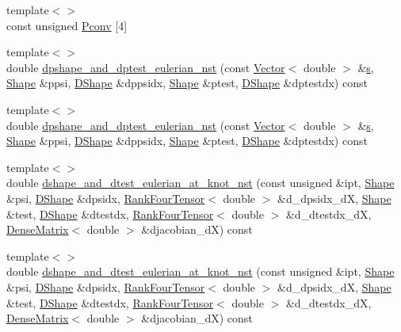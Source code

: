 \begin{DoxyCompactItemize}
{\footnotesize template$<$$>$ }\\const unsigned \hyperlink{classoomph_1_1TTaylorHoodElement_a294e334fc6a5632417b23ebf37fc7b16}{Pconv} \mbox{[}4\mbox{]}
\item 
{\footnotesize template$<$$>$ }\\double \hyperlink{classoomph_1_1TTaylorHoodElement_a24aab07a32be810c3d020072a3f4d84b}{dpshape\+\_\+and\+\_\+dptest\+\_\+eulerian\+\_\+nst} (const \hyperlink{classoomph_1_1Vector}{Vector}$<$ double $>$ \&\hyperlink{cfortran_8h_ab7123126e4885ef647dd9c6e3807a21c}{s}, \hyperlink{classoomph_1_1Shape}{Shape} \&ppsi, \hyperlink{classoomph_1_1DShape}{D\+Shape} \&dppsidx, \hyperlink{classoomph_1_1Shape}{Shape} \&ptest, \hyperlink{classoomph_1_1DShape}{D\+Shape} \&dptestdx) const
\item 
{\footnotesize template$<$$>$ }\\double \hyperlink{classoomph_1_1TTaylorHoodElement_a1d9b249727edb35ae6f454a0eb3f779c}{dpshape\+\_\+and\+\_\+dptest\+\_\+eulerian\+\_\+nst} (const \hyperlink{classoomph_1_1Vector}{Vector}$<$ double $>$ \&\hyperlink{cfortran_8h_ab7123126e4885ef647dd9c6e3807a21c}{s}, \hyperlink{classoomph_1_1Shape}{Shape} \&ppsi, \hyperlink{classoomph_1_1DShape}{D\+Shape} \&dppsidx, \hyperlink{classoomph_1_1Shape}{Shape} \&ptest, \hyperlink{classoomph_1_1DShape}{D\+Shape} \&dptestdx) const
\item 
{\footnotesize template$<$$>$ }\\double \hyperlink{classoomph_1_1TTaylorHoodElement_aa7eedbdb84e6b53605be1ee04dcbb076}{dshape\+\_\+and\+\_\+dtest\+\_\+eulerian\+\_\+at\+\_\+knot\+\_\+nst} (const unsigned \&ipt, \hyperlink{classoomph_1_1Shape}{Shape} \&psi, \hyperlink{classoomph_1_1DShape}{D\+Shape} \&dpsidx, \hyperlink{classoomph_1_1RankFourTensor}{Rank\+Four\+Tensor}$<$ double $>$ \&d\+\_\+dpsidx\+\_\+dX, \hyperlink{classoomph_1_1Shape}{Shape} \&test, \hyperlink{classoomph_1_1DShape}{D\+Shape} \&dtestdx, \hyperlink{classoomph_1_1RankFourTensor}{Rank\+Four\+Tensor}$<$ double $>$ \&d\+\_\+dtestdx\+\_\+dX, \hyperlink{classoomph_1_1DenseMatrix}{Dense\+Matrix}$<$ double $>$ \&djacobian\+\_\+dX) const
\item 
{\footnotesize template$<$$>$ }\\double \hyperlink{classoomph_1_1TTaylorHoodElement_af289723f650d3a19a59a8337b6667c45}{dshape\+\_\+and\+\_\+dtest\+\_\+eulerian\+\_\+at\+\_\+knot\+\_\+nst} (const unsigned \&ipt, \hyperlink{classoomph_1_1Shape}{Shape} \&psi, \hyperlink{classoomph_1_1DShape}{D\+Shape} \&dpsidx, \hyperlink{classoomph_1_1RankFourTensor}{Rank\+Four\+Tensor}$<$ double $>$ \&d\+\_\+dpsidx\+\_\+dX, \hyperlink{classoomph_1_1Shape}{Shape} \&test, \hyperlink{classoomph_1_1DShape}{D\+Shape} \&dtestdx, \hyperlink{classoomph_1_1RankFourTensor}{Rank\+Four\+Tensor}$<$ double $>$ \&d\+\_\+dtestdx\+\_\+dX, \hyperlink{classoomph_1_1DenseMatrix}{Dense\+Matrix}$<$ double $>$ \&djacobian\+\_\+dX) const
\end{DoxyCompactItemize}
